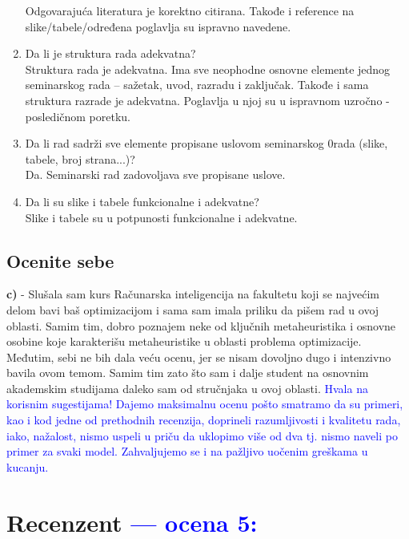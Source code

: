 \documentclass[a4paper]{report}
\newcommand{\odgovor}[1]{\textcolor{blue}{#1}}
\begin{document}
\begin{enumerate}
  Odgovarajuća literatura je korektno citirana. Takođe i reference na slike/tabele/određena poglavlja su ispravno navedene.
\item Da li je struktura rada adekvatna?\\
  Struktura rada je adekvatna. Ima sve neophodne osnovne elemente jednog seminarskog rada -- sažetak, uvod, razradu i zaključak. Takođe i sama struktura razrade je adekvatna. Poglavlja u njoj su u ispravnom uzročno - posledičnom poretku.
\item Da li rad sadrži sve elemente propisane uslovom seminarskog 0rada (slike, tabele, broj strana...)?\\ Da. Seminarski rad zadovoljava sve propisane uslove.
\item Da li su slike i tabele funkcionalne i adekvatne? \\ Slike i tabele su u potpunosti funkcionalne i adekvatne.
\end{enumerate}

\section{Ocenite sebe}

\textbf{c)} - Slušala sam kurs Računarska inteligencija na fakultetu koji se najvećim delom bavi baš optimizacijom i sama sam imala priliku da pišem rad u ovoj oblasti. Samim tim, dobro poznajem neke od ključnih metaheuristika i osnovne osobine koje karakterišu metaheuristike u oblasti problema optimizacije. Međutim, sebi ne bih dala veću ocenu, jer se nisam dovoljno dugo i intenzivno bavila ovom temom. Samim tim zato što sam i dalje student na osnovnim akademskim studijama daleko sam od stručnjaka u ovoj oblasti. \odgovor{Hvala na korisnim sugestijama! Dajemo maksimalnu ocenu pošto smatramo da su primeri, kao i kod jedne od prethodnih recenzija, doprineli razumljivosti i kvalitetu rada, iako, nažalost, nismo uspeli u priču da uklopimo više od dva tj. nismo naveli po primer za svaki model. Zahvaljujemo se i na pažljivo uočenim greškama u kucanju.}

\chapter{Recenzent \odgovor{--- ocena 5:} }
\end{document}
